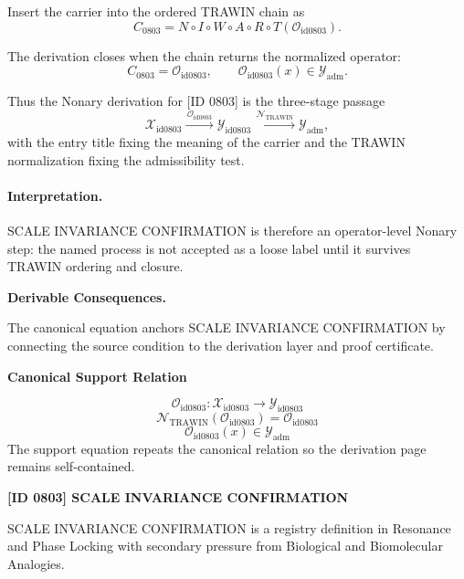 Insert the carrier into the ordered TRAWIN chain as\[
C_{0803}=N\circ I\circ W\circ A\circ R\circ T(\mathcal{O}_{\mathrm{id0803}}).
\]

The derivation closes when the chain returns the normalized operator:\[
C_{0803}=\mathcal{O}_{\mathrm{id0803}},\qquad \mathcal{O}_{\mathrm{id0803}}(x)\in\mathcal{Y}_{\mathrm{adm}}.
\]

Thus the Nonary derivation for [ID 0803] is the three-stage passage
\[
\mathcal{X}_{\mathrm{id0803}}\xrightarrow{\,\mathcal{O}_{\mathrm{id0803}}\,} \mathcal{Y}_{\mathrm{id0803}}\xrightarrow{\,\mathcal{N}_{\mathrm{TRAWIN}}\,} \mathcal{Y}_{\mathrm{adm}},
\]
with the entry title fixing the meaning of the carrier and the TRAWIN normalization fixing the admissibility test.

\paragraph{Interpretation.} SCALE INVARIANCE CONFIRMATION is therefore an operator-level Nonary step: the named process is not accepted as a loose label until it survives TRAWIN ordering and closure.

\par\vspace{0.35em}
\noindent\textbf{Derivable Consequences.}\quad
\begingroup
\footnotesize
\raggedright
The canonical equation anchors SCALE INVARIANCE CONFIRMATION by connecting the source condition to the derivation layer and proof certificate.
\par\endgroup

\noindent\textbf{Canonical Support Relation}\par
\[
\mathcal{O}_{\mathrm{id0803}}:\mathcal{X}_{\mathrm{id0803}}\longrightarrow\mathcal{Y}_{\mathrm{id0803}}
\]
\[
\mathcal{N}_{\mathrm{TRAWIN}}(\mathcal{O}_{\mathrm{id0803}})=\mathcal{O}_{\mathrm{id0803}}
\]
\[
\mathcal{O}_{\mathrm{id0803}}(x)\in\mathcal{Y}_{\mathrm{adm}}
\]
\noindent The support equation repeats the canonical relation so the derivation page remains self-contained.\par

\clearpage
\noindent\textbf{[ID 0803] SCALE INVARIANCE CONFIRMATION}\par
\vspace{0.35em}
\begingroup\small
{}
SCALE INVARIANCE CONFIRMATION is a registry definition in Resonance and Phase Locking with secondary pressure from Biological and Biomolecular Analogies.

